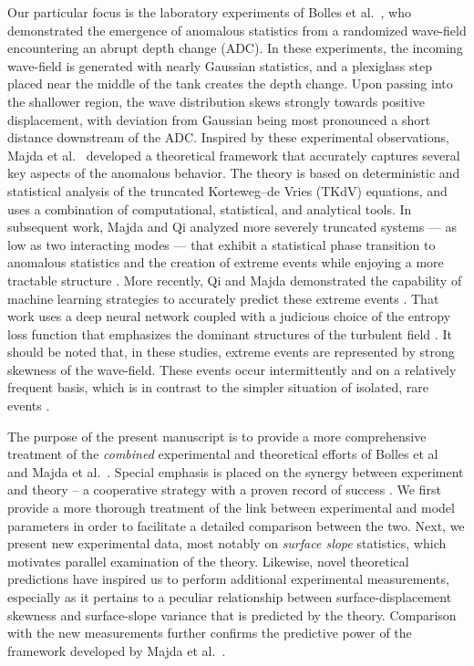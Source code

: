 \documentclass[11pt]{article}
\begin{document}
Our particular focus is the laboratory experiments of Bolles et al.~\cite{bolles2019}, who demonstrated the emergence of anomalous statistics from a randomized wave-field encountering an abrupt depth change (ADC). In these experiments, the incoming wave-field is generated with nearly Gaussian statistics, and a plexiglass step placed near the middle of the tank creates the depth change. Upon passing into the shallower region, the wave distribution skews strongly towards positive displacement, with deviation from Gaussian being most pronounced a short distance downstream of the ADC. Inspired by these experimental observations, Majda et al.~\cite{majda2019} developed a theoretical framework that accurately captures several key aspects of the anomalous behavior. The theory is based on deterministic and statistical analysis of the truncated Korteweg–de Vries (TKdV) equations, and uses a combination of computational, statistical, and analytical tools. In subsequent work, Majda and Qi analyzed more severely truncated systems --- as low as two interacting modes --- that exhibit a statistical phase transition to anomalous statistics and the creation of extreme events while enjoying a more tractable structure \cite{majdaqi2019}. More recently, Qi and Majda demonstrated the capability of machine learning strategies to accurately predict these extreme events \cite{MachineLearning2019}. That work uses a deep neural network coupled with a judicious choice of the entropy loss function that emphasizes the dominant structures of the turbulent field \cite{MachineLearning2019}. It should be noted that, in these studies, extreme events are represented by strong skewness of the wave-field. These events occur intermittently and on a relatively frequent basis, which is in contrast to the simpler situation of isolated, rare events \cite{guth2019machine}.


The purpose of the present manuscript is to provide a more comprehensive treatment of the {\em combined} experimental and theoretical efforts of Bolles et al~\cite{bolles2019} and Majda et al.~\cite{majda2019, majdaqi2019}. Special emphasis is placed on the synergy between experiment and theory -- a cooperative strategy with a proven record of success \cite{camassa2012stratified, ristroph2012, ganedi2018equilibrium}. 
We first provide a more thorough treatment of the link between experimental and model parameters in order to facilitate a detailed comparison between the two. Next, we present new experimental data, most notably on {\em surface slope} statistics, which motivates parallel examination of the theory.  Likewise, novel theoretical predictions have inspired us to perform additional experimental measurements, especially as it pertains to a peculiar relationship between surface-displacement skewness and surface-slope variance that is predicted by the theory. Comparison with the new measurements further confirms the predictive power of the framework developed by Majda et al.~\cite{majda2019}. 
\end{document}
